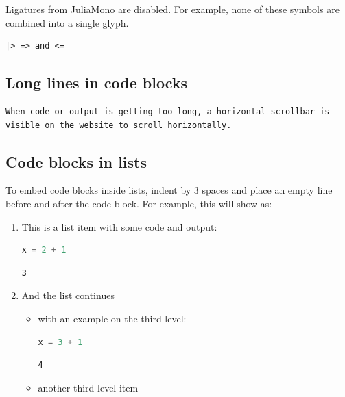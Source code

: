 \documentclass[
  notoc %
]{tufte-book}
\begin{document}
Ligatures from JuliaMono are disabled. For example, none of these
symbols are combined into a single glyph.

\begin{lstlisting}
|> => and <=
\end{lstlisting}

\hypertarget{long-lines-in-code-blocks}{%
\subsection{Long lines in code blocks}\label{long-lines-in-code-blocks}}

\begin{lstlisting}
When code or output is getting too long, a horizontal scrollbar is visible on the website to scroll horizontally.
\end{lstlisting}

\hypertarget{code-blocks-in-lists}{%
\subsection{Code blocks in lists}\label{code-blocks-in-lists}}

To embed code blocks inside lists, indent by 3 spaces and place an empty
line before and after the code block. For example, this will show as:

\begin{enumerate}
\def\labelenumi{\arabic{enumi}.}
\item
  This is a list item with some code and output:

  \begin{lstlisting}[language=Julia]
  x = 2 + 1
  \end{lstlisting}

  \begin{lstlisting}[language=Output]
  3
  \end{lstlisting}
\item
  And the list continues

  \begin{itemize}
  \item
    with an example on the third level:

    \begin{lstlisting}[language=Julia]
    x = 3 + 1
    \end{lstlisting}

    \begin{lstlisting}[language=Output]
    4
    \end{lstlisting}
  \item
    another third level item
  \end{itemize}
\end{enumerate}
\end{document}
